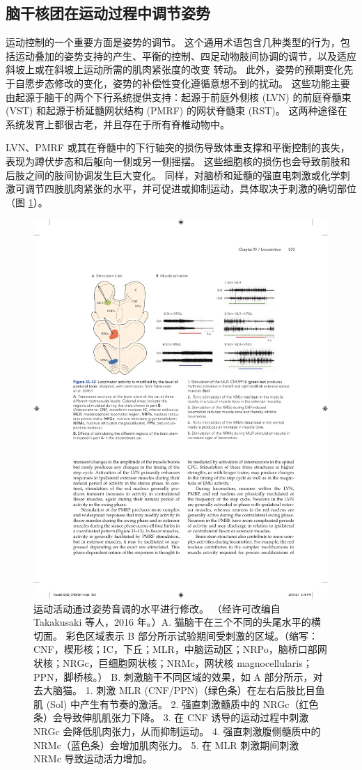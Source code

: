 \subsection{脑干核团在运动过程中调节姿势}
运动控制的一个重要方面是姿势的调节。 这个通用术语包含几种类型的行为，包括运动叠加的姿势支持的产生、平衡的控制、四足动物肢间协调的调节，以及适应斜坡上或在斜坡上运动所需的肌肉紧张度的改变 转动。 此外，姿势的预期变化先于自愿步态修改的变化，姿势的补偿性变化遵循意想不到的扰动。 这些功能主要由起源于脑干的两个下行系统提供支持：起源于前庭外侧核 (LVN) 的前庭脊髓束 (VST) 和起源于桥延髓网状结构 (PMRF) 的网状脊髓束 (RST)。 这两种途径在系统发育上都很古老，并且存在于所有脊椎动物中。

LVN、PMRF 或其在脊髓中的下行轴突的损伤导致体重支撑和平衡控制的丧失，表现为蹲伏步态和后躯向一侧或另一侧摇摆。 这些细胞核的损伤也会导致前肢和后肢之间的肢间协调发生巨大变化。
同样，对脑桥和延髓的强直电刺激或化学刺激可调节四肢肌肉紧张的水平，并可促进或抑制运动，具体取决于刺激的确切部位（图 \ref{fig:33_12}）。

\begin{figure}[htbp]
	\centering
	\includegraphics[width=0.8\linewidth]{chap33/fig_33_12}
	\caption{运动活动通过姿势音调的水平进行修改。 （经许可改编自 Takakusaki 等人，2016 年。）A. 猫脑干在三个不同的头尾水平的横切面。 彩色区域表示 B 部分所示试验期间受刺激的区域。（缩写：CNF，楔形核；IC，下丘；MLR，中脑运动区；NRPo，脑桥口部网状核；NRGc，巨细胞网状核；NRMc，网状核 magnocellularis；PPN，脚桥核。） B. 刺激脑干不同区域的效果，如 A 部分所示，对去大脑猫。 1. 刺激 MLR (CNF/PPN)（绿色条）在左右后肢比目鱼肌 (Sol) 中产生有节奏的激活。 2. 强直刺激髓质中的 NRGc（红色条）会导致伸肌肌张力下降。 3. 在 CNF 诱导的运动过程中刺激 NRGc 会降低肌肉张力，从而抑制运动。 4. 强直刺激腹侧髓质中的 NRMc（蓝色条）会增加肌肉张力。 5. 在 MLR 刺激期间刺激 NRMc 导致运动活力增加。}
	\label{fig:33_12}
\end{figure}

